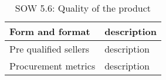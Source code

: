 \begin{table}[H]
\begin{tabular}{>{\raggedright\arraybackslash}p{3cm} >{\arraybackslash}p{11cm}}
		Form and format & description\vspace{0.2cm} \\
		
		\midrule
		
		Pre qualified sellers & description\vspace{0.2cm} \\
		
		\midrule
		
		Procurement metrics & description\vspace{0.2cm} \\
		
		\bottomrule[2pt]		
		
	\end{tabular}
	\caption{SOW 5.6: Quality of the product}
\end{table}


